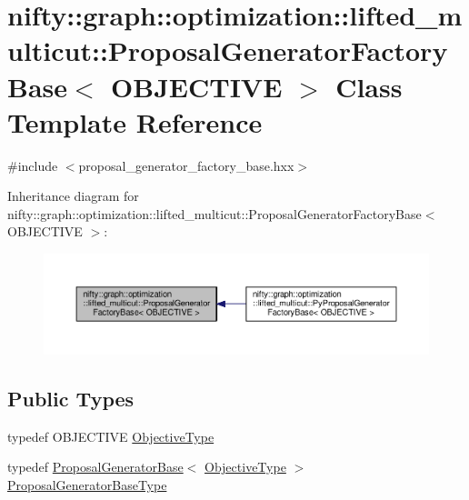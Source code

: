 \hypertarget{classnifty_1_1graph_1_1optimization_1_1lifted__multicut_1_1ProposalGeneratorFactoryBase}{}\section{nifty\+:\+:graph\+:\+:optimization\+:\+:lifted\+\_\+multicut\+:\+:Proposal\+Generator\+Factory\+Base$<$ O\+B\+J\+E\+C\+T\+I\+V\+E $>$ Class Template Reference}
\label{classnifty_1_1graph_1_1optimization_1_1lifted__multicut_1_1ProposalGeneratorFactoryBase}


{\ttfamily \#include $<$proposal\+\_\+generator\+\_\+factory\+\_\+base.\+hxx$>$}



Inheritance diagram for nifty\+:\+:graph\+:\+:optimization\+:\+:lifted\+\_\+multicut\+:\+:Proposal\+Generator\+Factory\+Base$<$ O\+B\+J\+E\+C\+T\+I\+V\+E $>$\+:\nopagebreak
\begin{figure}[H]
\begin{center}
\leavevmode
\includegraphics[width=350pt]{classnifty_1_1graph_1_1optimization_1_1lifted__multicut_1_1ProposalGeneratorFactoryBase__inherit__graph}
\end{center}
\end{figure}
\subsection*{Public Types}
\begin{DoxyCompactItemize}
\item 
typedef O\+B\+J\+E\+C\+T\+I\+V\+E \hyperlink{classnifty_1_1graph_1_1optimization_1_1lifted__multicut_1_1ProposalGeneratorFactoryBase_a8f28c3436d92e95d43d3be3510729829}{Objective\+Type}
\item 
typedef \hyperlink{classnifty_1_1graph_1_1optimization_1_1lifted__multicut_1_1ProposalGeneratorBase}{Proposal\+Generator\+Base}$<$ \hyperlink{classnifty_1_1graph_1_1optimization_1_1lifted__multicut_1_1ProposalGeneratorFactoryBase_a8f28c3436d92e95d43d3be3510729829}{Objective\+Type} $>$ \hyperlink{classnifty_1_1graph_1_1optimization_1_1lifted__multicut_1_1ProposalGeneratorFactoryBase_a0742c3a5da3f5d887e790cfffe5fa026}{Proposal\+Generator\+Base\+Type}
\end{DoxyCompactItemize}
